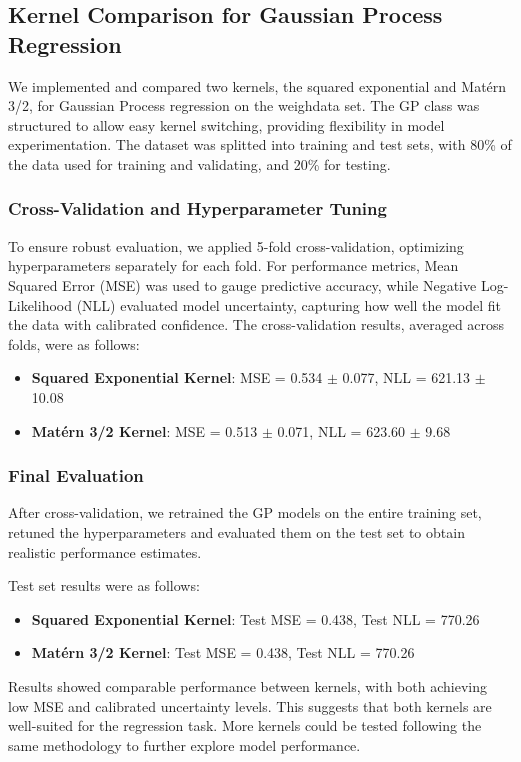 \documentclass[twocolumn]{article}
\begin{document}
\subsection{Kernel Comparison for Gaussian Process Regression}

We implemented and compared two kernels, the squared exponential and Matérn 3/2, 
for Gaussian Process regression on the weighdata set. The GP class was structured to allow easy kernel switching, providing flexibility 
in model experimentation. The dataset was splitted into training and test sets, with 80\% of the data used for training and validating, and 20\% for testing.

\subsubsection{Cross-Validation and Hyperparameter Tuning}
To ensure robust evaluation, we applied 5-fold cross-validation, optimizing hyperparameters
 separately for each fold. For performance metrics, Mean Squared Error (MSE) was used to gauge predictive accuracy, 
 while Negative Log-Likelihood (NLL) evaluated model uncertainty, capturing how well the model fit the data with calibrated confidence. 
 The cross-validation results, averaged across folds, were as follows:
\begin{itemize}
    \item \textbf{Squared Exponential Kernel}: MSE = 0.534 $\pm$ 0.077, NLL = 621.13 $\pm$ 10.08
    \item \textbf{Matérn 3/2 Kernel}: MSE = 0.513 $\pm$ 0.071, NLL = 623.60 $\pm$ 9.68
\end{itemize}

\subsubsection{Final Evaluation}
After cross-validation, we retrained the GP models on the entire training set, retuned the hyperparameters 
and evaluated them on the test set to obtain realistic performance estimates. 

Test set results were as follows:
\begin{itemize}
    \item \textbf{Squared Exponential Kernel}: Test MSE = 0.438, Test NLL = 770.26
    \item \textbf{Matérn 3/2 Kernel}: Test MSE = 0.438, Test NLL = 770.26
\end{itemize}

Results showed comparable performance between kernels, with both achieving low MSE and calibrated uncertainty levels. 
This suggests that both kernels are well-suited for the regression task. More kernels could be tested 
following the same methodology to further explore model performance.
\end{document}
